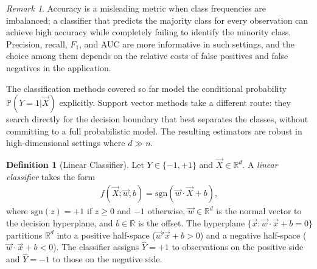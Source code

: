 \documentclass[11pt]{article}
\theoremstyle{definition}
\newtheorem{definition}{Definition}[section]
\theoremstyle{plain}
\theoremstyle{remark}
\newtheorem{remark}{Remark}[section]
\begin{document}
\begin{remark}
    Accuracy is a misleading metric when class frequencies are imbalanced; a classifier that predicts the majority class for every observation can achieve high accuracy while completely failing to identify the minority class. Precision, recall, $F_1$, and AUC are more informative in such settings, and the choice among them depends on the relative costs of false positives and false negatives in the application.
\end{remark}

The classification methods covered so far model the conditional probability $\mathbb{P}(Y=1|\vec{X})$ explicitly. Support vector methods take a different route: they search directly for the decision boundary that best separates the classes, without committing to a full probabilistic model. The resulting estimators are robust in high-dimensional settings where $d \gg n$.

\begin{definition}[Linear Classifier]
    Let $Y \in \{-1, +1\}$ and $\vec{X} \in \mathbb{R}^d$. A \textit{linear classifier} takes the form
    \begin{align}
        f(\vec{X};\vec{w},b) = \mathrm{sgn}(\vec{w}\cdot\vec{X} + b),
    \end{align}
    where $\mathrm{sgn}(z) = +1$ if $z \geq 0$ and $-1$ otherwise, $\vec{w} \in \mathbb{R}^d$ is the normal vector to the decision hyperplane, and $b \in \mathbb{R}$ is the offset. The hyperplane $\{\vec{x} : \vec{w}\cdot\vec{x} + b = 0\}$ partitions $\mathbb{R}^d$ into a positive half-space ($\vec{w}'\vec{x} + b > 0$) and a negative half-space ($\vec{w}\cdot\vec{x} + b < 0$). The classifier assigns $\hat{Y} = +1$ to observations on the positive side and $\hat{Y} = -1$ to those on the negative side.
\end{definition}
\end{document}
